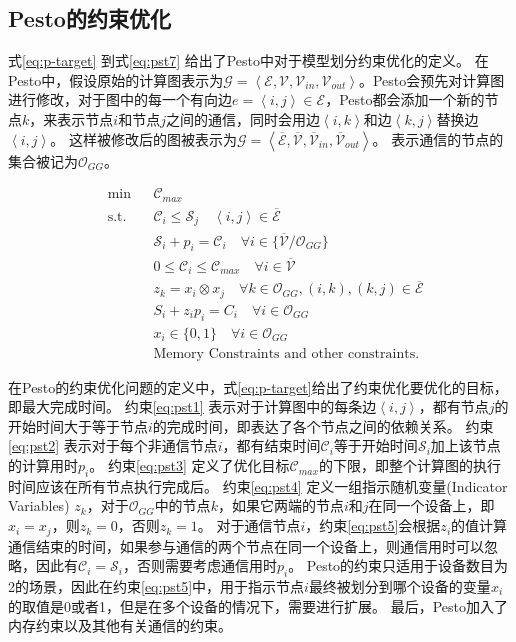 \subsection{Pesto的约束优化}
\label{sec:pesto}
式\ref{eq:p-target} 到式\ref{eq:pst7} 给出了Pesto中对于模型划分约束优化的定义。
在Pesto中，假设原始的计算图表示为$\mathcal{G}=\left\langle \mathcal{E}, \mathcal{V}, \mathcal{V}_{in}, \mathcal{V}_{out}\right\rangle $。Pesto会预先对计算图进行修改，对于图中的每一个有向边$e=\left\langle i,j \right\rangle\in\mathcal{E}$，Pesto都会添加一个新的节点$k$，来表示节点$i$和节点$j$之间的通信，同时会用边$\left\langle i,k\right\rangle $和边$\left\langle k,j\right\rangle $替换边$\left\langle i,j\right\rangle $。
这样被修改后的图被表示为$\mathcal{G}=\left\langle \mathcal{\overline{E}},\mathcal{\overline{V}},\mathcal{\overline{V}}_{in},\mathcal{\overline{V}}_{out} \right\rangle$。
表示通信的节点的集合被记为$\mathcal{O}_{GG}$。


\begin{align}
	& \mathrm{min} & &\mathcal{C}_{\mathit{max}} \label{eq:p-target}\\
	& \mathrm{s.t.} & &\mathcal{C}_i \le \mathcal{S}_j \quad \left\langle i,j \right\rangle\in \mathcal{\overline{E}}  \label{eq:pst1}\\
	& & &\mathcal{S}_i + p_i = \mathcal{C}_i  \quad\forall i\in \{\overline{\mathcal{V}} / \mathcal{O}_{GG} \}  \label{eq:pst2}\\
	& & &0\le \mathcal{C}_i\le \mathcal{C}_{\mathit{max}} \quad\forall i\in \overline{\mathcal{V}} \label{eq:pst3}\\
	& & & z_k = x_i \otimes x_j \quad\forall k \in \mathcal{O}_{GG}, (i,k),(k,j)\in\overline{\mathcal{E}} \label{eq:pst4}\\
	& & & S_i + z_i p_i = C_i \quad \forall i \in \mathcal{O}_{GG}\label{eq:pst5} \\
	& & & x_i \in \{0,1\} \quad\forall i \in \mathcal{O}_{GG} \label{eq:pst6}\\
	& & & \text{Memory Constraints and other constraints.} \label{eq:pst7}
\end{align}

在Pesto的约束优化问题的定义中，式\ref{eq:p-target}给出了约束优化要优化的目标，即最大完成时间。
约束\ref{eq:pst1} 表示对于计算图中的每条边$\left\langle i,j\right\rangle $，都有节点$j$的开始时间大于等于节点$i$的完成时间，即表达了各个节点之间的依赖关系。
约束\ref{eq:pst2} 表示对于每个非通信节点$i$，都有结束时间$\mathcal{C}_i$等于开始时间$\mathcal{S}_i$加上该节点的计算用时$p_i$。
约束\ref{eq:pst3} 定义了优化目标$\mathcal{C}_{max}$的下限，即整个计算图的执行时间应该在所有节点执行完成后。
约束\ref{eq:pst4} 定义一组指示随机变量(Indicator Variables) $z_k$，对于$\mathcal{O}_{GG}$中的节点$k$，如果它两端的节点$i$和$j$在同一个设备上，即$x_i=x_j$，则$z_k=0$，否则$z_k=1$。
对于通信节点$i$，约束\ref{eq:pst5}会根据$z_i$的值计算通信结束的时间，如果参与通信的两个节点在同一个设备上，则通信用时可以忽略，因此有$\mathcal{C}_i=\mathcal{S}_i$，否则需要考虑通信用时$p_i$。
Pesto的约束只适用于设备数目为2的场景，因此在约束\ref{eq:pst5}中，用于指示节点$i$最终被划分到哪个设备的变量$x_i$的取值是0或者1，但是在多个设备的情况下，需要进行扩展。
最后，Pesto加入了内存约束以及其他有关通信的约束。

